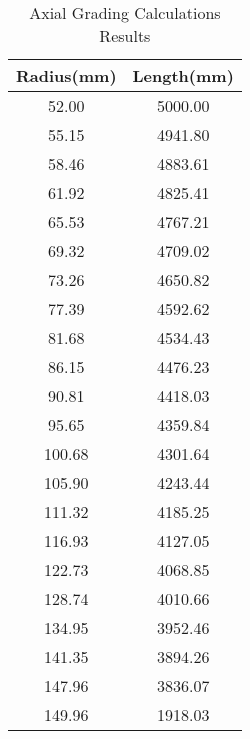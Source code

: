 \begin{table}[!htb]
\caption{Axial Grading Calculations Results}
\label{table:axiallvals}
\begin{center}
\begin{tabular}{cc}
\toprule
\textbf{Radius(mm)} & \textbf{Length(mm)} \\ \toprule
52.00 & 5000.00 \\
55.15 & 4941.80 \\
58.46 & 4883.61 \\
61.92 & 4825.41 \\
65.53 & 4767.21 \\
69.32 & 4709.02 \\
73.26 & 4650.82 \\
77.39 & 4592.62 \\
81.68 & 4534.43 \\
86.15 & 4476.23 \\
90.81 & 4418.03 \\
95.65 & 4359.84 \\
100.68 & 4301.64 \\
105.90 & 4243.44 \\
111.32 & 4185.25 \\
116.93 & 4127.05 \\
122.73 & 4068.85 \\
128.74 & 4010.66 \\
134.95 & 3952.46 \\
141.35 & 3894.26 \\
147.96 & 3836.07 \\
149.96 & 1918.03 \\
\bottomrule
\end{tabular}
\end{center}
\end{table}
